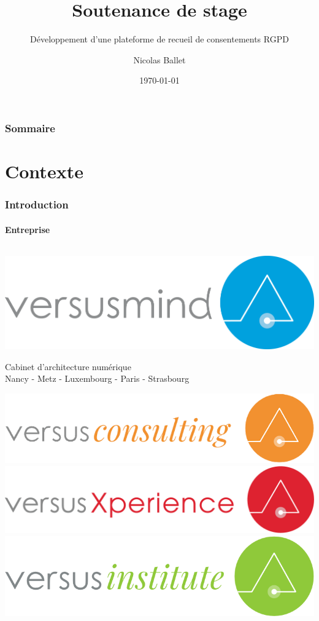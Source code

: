 \documentclass[aspectratio=169]{beamer}
\title[Développement d’une plateforme de recueil de consentements RGPD]{Soutenance de stage}
\subtitle{Développement d’une plateforme de recueil de consentements RGPD}
\author{Nicolas Ballet}
\institute[UTBM]{Université de Technologie de Belfort Montbéliard}
\date[\the\year-\twodigits\month-\twodigits\day]{\today}
\begin{document}
\begin{frame}
    \titlepage{}
\end{frame}
\begin{frame}[noframenumbering]
    \frametitle{Sommaire}
    \tableofcontents
\end{frame}

\section{Contexte}
\begin{frame}
    \frametitle{Introduction}
    \framesubtitle{Entreprise}
    \begin{columns}
        \hfill
        \begin{column}{.45\textwidth}
            \parbox[c][0.8\textheight][c]{\columnwidth}{
                \begin{center}
                    \includegraphics[width=.8\textwidth]{versusmind.png}
                \end{center}
                \begin{center}
                    \color{gray} Cabinet d'architecture numérique\\
                    \scriptsize\color{gray}Nancy \hyp{} Metz \hyp{} Luxembourg \hyp{} Paris \hyp{} Strasbourg
                \end{center}
                \includegraphics[width=.62\textwidth]{versusconsulting.png}
                \includegraphics[width=.65\textwidth, right]{versusxperience.png}
                \includegraphics[width=.55\textwidth]{versusinstitute.png}
}
\end{column}
\end{columns}
\end{frame}
\end{document}
